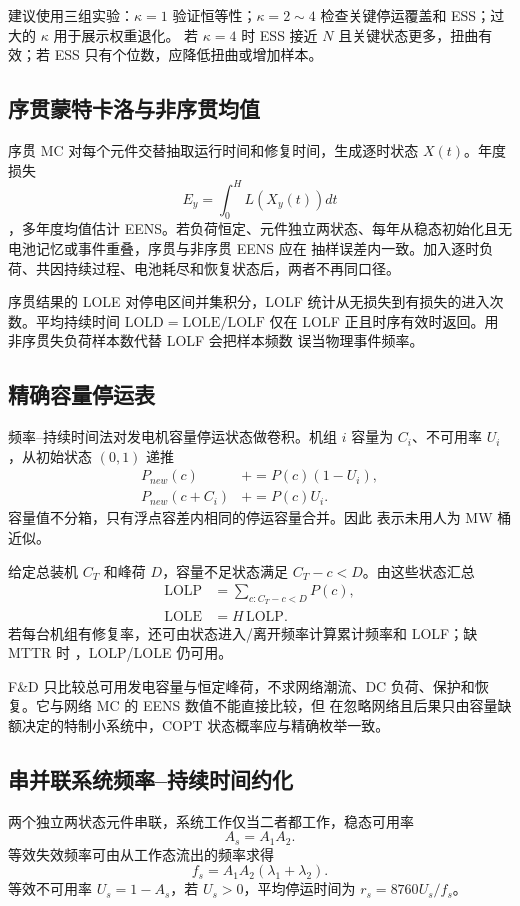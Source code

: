 建议使用三组实验：$\kappa=1$ 验证恒等性；$\kappa=2\sim4$ 检查关键停运覆盖和 ESS；过大的 $\kappa$ 用于展示权重退化。
若 $\kappa=4$ 时 ESS 接近 $N$ 且关键状态更多，扭曲有效；若 ESS 只有个位数，应降低扭曲或增加样本。

\subsection{序贯蒙特卡洛与非序贯均值}
序贯 MC 对每个元件交替抽取运行时间和修复时间，生成逐时状态 $X(t)$。年度损失
\begin{equation}
 E_y=\int_0^HL(X_y(t))dt
\end{equation}
，多年度均值估计 EENS。若负荷恒定、元件独立两状态、每年从稳态初始化且无电池记忆或事件重叠，序贯与非序贯 EENS 应在
抽样误差内一致。加入逐时负荷、共因持续过程、电池耗尽和恢复状态后，两者不再同口径。

序贯结果的 LOLE 对停电区间并集积分，LOLF 统计从无损失到有损失的进入次数。平均持续时间
$\mathrm{LOLD}=\mathrm{LOLE}/\mathrm{LOLF}$ 仅在 LOLF 正且时序有效时返回。用非序贯失负荷样本数代替 LOLF 会把样本频数
误当物理事件频率。

\subsection{精确容量停运表}
频率--持续时间法对发电机容量停运状态做卷积。机组 $i$ 容量为 $C_i$、不可用率 $U_i$，从初始状态
$(0,1)$ 递推
\begin{align}
 P_{new}(c)&\mathrel{+}=P(c)(1-U_i),\\
 P_{new}(c+C_i)&\mathrel{+}=P(c)U_i.
\end{align}
容量值不分箱，只有浮点容差内相同的停运容量合并。因此
 表示未用人为 MW 桶近似。

给定总装机 $C_T$ 和峰荷 $D$，容量不足状态满足 $C_T-c<D$。由这些状态汇总
\begin{align}
 \mathrm{LOLP}&=\sum_{c:C_T-c<D}P(c),\\
 \mathrm{LOLE}&=H\,\mathrm{LOLP}.
\end{align}
若每台机组有修复率，还可由状态进入/离开频率计算累计频率和 LOLF；缺 MTTR 时
，LOLP/LOLE 仍可用。

F\&D 只比较总可用发电容量与恒定峰荷，不求网络潮流、DC 负荷、保护和恢复。它与网络 MC 的 EENS 数值不能直接比较，但
在忽略网络且后果只由容量缺额决定的特制小系统中，COPT 状态概率应与精确枚举一致。

\subsection{串并联系统频率--持续时间约化}
两个独立两状态元件串联，系统工作仅当二者都工作，稳态可用率
\begin{equation}
 A_s=A_1A_2.
\end{equation}
等效失效频率可由从工作态流出的频率求得
\begin{equation}
 f_s=A_1A_2(\lambda_1+\lambda_2).
\end{equation}
等效不可用率 $U_s=1-A_s$，若 $U_s>0$，平均停运时间为 $r_s=8760U_s/f_s$。

